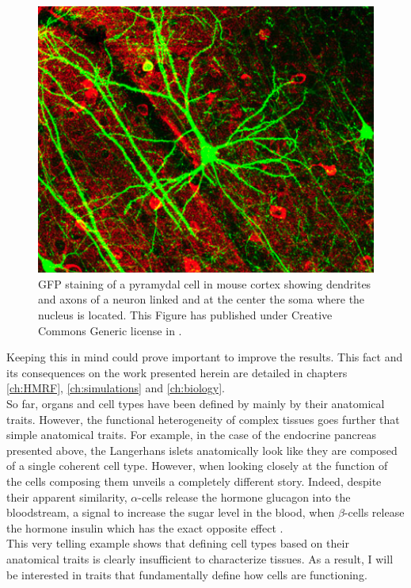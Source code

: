 \begin{figure}[bth]
\begin{center}
  \includegraphics[width=0.8\linewidth]{gfx/chapter1/neuron.png}
\end{center}
  \caption{GFP staining of a pyramydal cell in mouse cortex showing dendrites and axons of a neuron linked and at the center the soma where the nucleus is located. This Figure has published under Creative Commons Generic license in \cite{lee06}.}
  \label{fig:neuron}
\end{figure}
	
    
     
     Keeping this in mind could prove important to improve the results. This fact and its consequences on the work presented herein are detailed in chapters \ref{ch:HMRF}, \ref{ch:simulations} and \ref{ch:biology}.\\
     
     So far, organs and cell types have been defined by mainly by their anatomical traits. However, the functional heterogeneity of complex tissues goes further that simple anatomical traits. For example, in the case of the endocrine pancreas presented above, the Langerhans islets anatomically look like they are composed of a single coherent cell type. However, when looking closely at the function of the cells composing them unveils a completely different story. Indeed, despite their apparent similarity, $\alpha$-cells release the hormone glucagon into the bloodstream, a signal to increase the sugar level in the blood, when $\beta$-cells release the hormone insulin which has the exact opposite effect \cite{costanzo06}.\\
     
     This very telling example shows that defining cell types based on their anatomical traits is clearly insufficient to characterize tissues.  As a result, I will be interested in traits that fundamentally define how cells are functioning.

